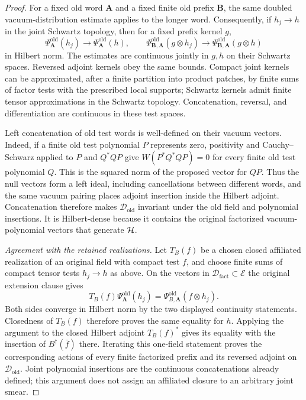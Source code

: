 \begin{proof}
For a fixed old word
$\mathbf A$ and a fixed finite old prefix $\mathbf B$, the same doubled
vacuum-distribution estimate applies to the longer word. Consequently, if
$h_j\to h$ in the joint Schwartz topology, then for a fixed prefix kernel
$g$,
\[
 \Psi^{\mathrm{old}}_{\mathbf A}(h_j)\longrightarrow
 \Psi^{\mathrm{old}}_{\mathbf A}(h),\qquad
 \Psi^{\mathrm{old}}_{\mathbf B,\mathbf A}(g\otimes h_j)
 \longrightarrow
 \Psi^{\mathrm{old}}_{\mathbf B,\mathbf A}(g\otimes h)
\]
in Hilbert norm. The estimates are continuous jointly in $g,h$ on their
Schwartz spaces. Reversed adjoint kernels obey the same bounds. Compact
joint kernels can be approximated, after a finite partition into product
patches, by finite sums of factor tests with the prescribed local supports;
Schwartz kernels admit finite tensor approximations in the Schwartz
topology. Concatenation, reversal, and differentiation are continuous in
these test spaces.

Left concatenation of old test words is well-defined on their vacuum
vectors. Indeed, if a finite old test polynomial $P$ represents zero,
positivity and Cauchy--Schwarz applied to $P$ and $Q^*QP$ give
$W(P^*Q^*QP)=0$ for every finite old test polynomial $Q$. This is the
squared norm of the proposed vector for $QP$. Thus the null vectors form
a left ideal, including cancellations between different words, and the
same vacuum pairing places adjoint insertion inside the Hilbert adjoint.
Concatenation therefore makes $\mathcal D_{\mathrm{old}}$ invariant
under the old field and polynomial insertions. It is Hilbert-dense because
it contains the original factorized vacuum-polynomial vectors that generate
$\mathcal H$.

\emph{Agreement with the retained realizations.}
Let $T_B(f)$
be a chosen closed affiliated realization of an original field with compact
test $f$, and choose finite sums of compact tensor tests $h_j\to h$ as above.
On the vectors in $\mathcal D_{\mathrm{fact}}\subset\mathcal E$ the original extension clause gives
\[
 T_B(f)\Psi^{\mathrm{old}}_{\mathbf A}(h_j)
   =\Psi^{\mathrm{old}}_{B,\mathbf A}(f\otimes h_j).
\]
Both sides converge in Hilbert norm by the two displayed continuity
statements. Closedness of $T_B(f)$ therefore proves the same equality for
$h$. Applying the argument to the closed Hilbert adjoint $T_B(f)^*$ gives
its equality with the insertion of $B^\dagger(\bar f)$ there. Iterating
this one-field statement proves the corresponding actions of every finite
factorized prefix and its reversed adjoint on
$\mathcal D_{\mathrm{old}}$. Joint polynomial insertions are the continuous
concatenations already defined; this argument does not assign an affiliated
closure to an arbitrary joint smear.


\end{proof}

